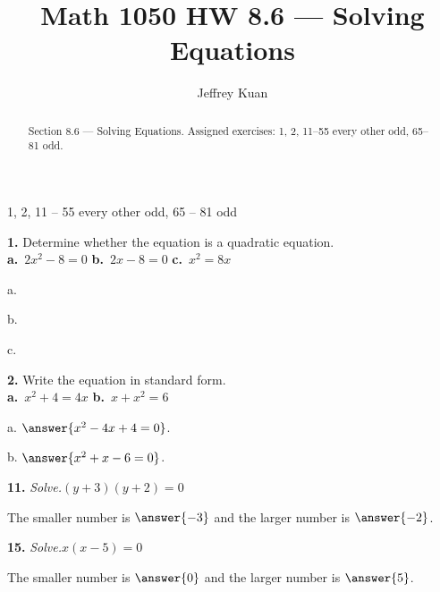 \documentclass{ximera}
\author{Jeffrey Kuan}
\title{Math 1050 HW 8.6 --- Solving Equations}
\begin{document}
\begin{abstract}
    Section 8.6 --- Solving Equations.
    Assigned exercises: 1, 2, 11–55 every other odd, 65–81 odd.
\end{abstract}

\maketitle

1, 2, 11 – 55 every other odd, 65 – 81 odd

\begin{problem}
\textbf{1.} Determine whether the equation is a quadratic equation.
  \\[2pt]
  \hspace*{1.5em}
  \textbf{a.}~$2x^2 - 8 = 0$ \qquad \textbf{b.}~$2x - 8 = 0$ \qquad
  \textbf{c.}~$x^2 = 8x$

a.

\begin{multipleChoice} 
\end{multipleChoice}

b.

\begin{multipleChoice} 
\end{multipleChoice}

c.

\begin{multipleChoice} 
\end{multipleChoice}
\end{problem}

\begin{problem}
\textbf{2.} Write the equation in standard form.
  \\[2pt]
  \hspace*{1.5em}
  \textbf{a.}~$x^2 + 4 = 4x$ \qquad \textbf{b.}~$x + x^2 = 6$

a. $\answer{x^2-4x+4=0}$.

b. $\answer{x^2+x-6=0}$.
\end{problem}

\begin{problem}
\textbf{11.} \emph{Solve.}\quad $(y + 3)(y + 2) = 0$

The smaller number is $\answer{-3}$ and the larger number is $\answer{-2}$.
\end{problem}

\begin{problem}
\textbf{15.} \emph{Solve.}\quad $x(x - 5) = 0$

The smaller number is $\answer{0}$ and the larger number is $\answer{5}$.
\end{problem}
\end{document}
